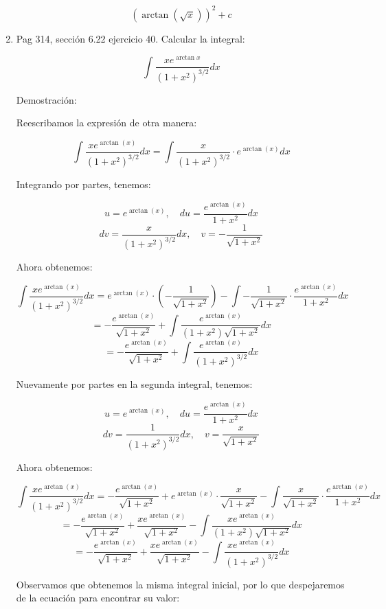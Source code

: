 \documentclass{report}
\begin{document}
\begin{enumerate}
        $$(\arctan(\sqrt{x}))^2 + c$$
        
        \item Pag 314, sección 6.22 ejercicio 40. Calcular la integral:
        
        \[ \int \frac{x e^{\arctan x}}{\left(1+x^{2}\right)^{3 / 2}} d x \]
        
        Demostración:
        
        Reescribamos la expresión de otra manera:
        
        \[ \int{\frac{xe^{\arctan(x)}}{(1+x^2)^{3/2}}dx} = \int{\frac{x}{(1+x^2)^{3/2}} \cdot e^{\arctan(x)}dx} \]
        
        Integrando por partes, tenemos:
        
        \[ u = e^{\arctan(x)}, \quad du = \frac{e^{\arctan(x)}}{1+x^2}dx \]
        \[ dv = \frac{x}{(1+x^2)^{3/2}}dx, \quad v = -\frac{1}{\sqrt{1+x^2}} \]
        
        Ahora obtenemos:
        
        \[ \int{\frac{xe^{\arctan(x)}}{(1+x^2)^{3/2}}dx} = e^{\arctan(x)} \cdot \left(-\frac{1}{\sqrt{1+x^2}}\right) - \int{-\frac{1}{\sqrt{1+x^2}} \cdot \frac{e^{\arctan(x)}}{1+x^2}dx} \]
        \[ = -\frac{e^{\arctan(x)}}{\sqrt{1+x^2}} + \int{\frac{e^{\arctan(x)}}{(1+x^2)\sqrt{1+x^2}}dx} \]
        \[ = -\frac{e^{\arctan(x)}}{\sqrt{1+x^2}} + \int{\frac{e^{\arctan(x)}}{(1+x^2)^{3/2}}dx} \]
        
        Nuevamente por partes en la segunda integral, tenemos:
        
        \[ u = e^{\arctan(x)}, \quad du = \frac{e^{\arctan(x)}}{1+x^2}dx \]
        \[ dv = \frac{1}{(1+x^2)^{3/2}}dx, \quad v = \frac{x}{\sqrt{1+x^2}} \]
        
        Ahora obtenemos:
        
        \[ \int{\frac{xe^{\arctan(x)}}{(1+x^2)^{3/2}}dx} = -\frac{e^{\arctan(x)}}{\sqrt{1+x^2}} + e^{\arctan(x)} \cdot \frac{x}{\sqrt{1+x^2}} - \int{\frac{x}{\sqrt{1+x^2}} \cdot \frac{e^{\arctan(x)}}{1+x^2}dx} \]
        \[ = -\frac{e^{\arctan(x)}}{\sqrt{1+x^2}} + \frac{xe^{\arctan(x)}}{\sqrt{1+x^2}} - \int{\frac{xe^{\arctan(x)}}{(1+x^2)\sqrt{1+x^2}}dx} \]
        \[ = -\frac{e^{\arctan(x)}}{\sqrt{1+x^2}} + \frac{xe^{\arctan(x)}}{\sqrt{1+x^2}} - \int{\frac{xe^{\arctan(x)}}{(1+x^2)^{3/2}}dx} \]
        
        Observamos que obtenemos la misma integral inicial, por lo que despejaremos de la ecuación para encontrar su valor:
        

\end{enumerate}
\end{document}
